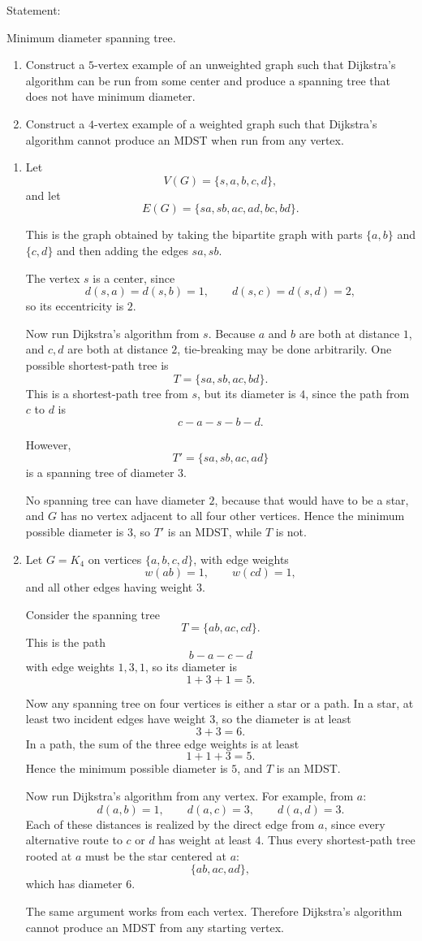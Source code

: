 \documentclass[11pt]{article}
\begin{document}
Statement: {Minimum diameter spanning tree.
\begin{enumerate}
\item Construct a $5$-vertex example of an unweighted graph such that Dijkstra's algorithm can be run from some center and produce a spanning tree that does not have minimum diameter.
\item Construct a $4$-vertex example of a weighted graph such that Dijkstra's algorithm cannot produce an MDST when run from any vertex.
\end{enumerate}}

\medskip

\begin{enumerate}
\item Let
\[
V(G)=\{s,a,b,c,d\},
\]
and let
\[
E(G)=\{sa,sb,ac,ad,bc,bd\}.
\]

This is the graph obtained by taking the bipartite graph with parts $\{a,b\}$ and $\{c,d\}$ and then adding the edges $sa,sb$.

The vertex $s$ is a center, since
\[
d(s,a)=d(s,b)=1,\qquad d(s,c)=d(s,d)=2,
\]
so its eccentricity is $2$.

Now run Dijkstra's algorithm from $s$. Because $a$ and $b$ are both at distance $1$, and $c,d$ are both at distance $2$, tie-breaking may be done arbitrarily. One possible shortest-path tree is
\[
T=\{sa,sb,ac,bd\}.
\]
This is a shortest-path tree from $s$, but its diameter is $4$, since the path from $c$ to $d$ is
\[
c-a-s-b-d.
\]

However,
\[
T'=\{sa,sb,ac,ad\}
\]
is a spanning tree of diameter $3$.

No spanning tree can have diameter $2$, because that would have to be a star, and $G$ has no vertex adjacent to all four other vertices. Hence the minimum possible diameter is $3$, so $T'$ is an MDST, while $T$ is not.

\item Let $G=K_4$ on vertices $\{a,b,c,d\}$, with edge weights
\[
w(ab)=1,\qquad w(cd)=1,
\]
and all other edges having weight $3$.

Consider the spanning tree
\[
T=\{ab,ac,cd\}.
\]
This is the path
\[
b-a-c-d
\]
with edge weights $1,3,1$, so its diameter is
\[
1+3+1=5.
\]

Now any spanning tree on four vertices is either a star or a path. In a star, at least two incident edges have weight $3$, so the diameter is at least
\[
3+3=6.
\]
In a path, the sum of the three edge weights is at least
\[
1+1+3=5.
\]
Hence the minimum possible diameter is $5$, and $T$ is an MDST.

Now run Dijkstra's algorithm from any vertex. For example, from $a$:
\[
d(a,b)=1,\qquad d(a,c)=3,\qquad d(a,d)=3.
\]
Each of these distances is realized by the direct edge from $a$, since every alternative route to $c$ or $d$ has weight at least $4$. Thus every shortest-path tree rooted at $a$ must be the star centered at $a$:
\[
\{ab,ac,ad\},
\]
which has diameter $6$.

The same argument works from each vertex. Therefore Dijkstra's algorithm cannot produce an MDST from any starting vertex.
\end{enumerate}
\end{document}
